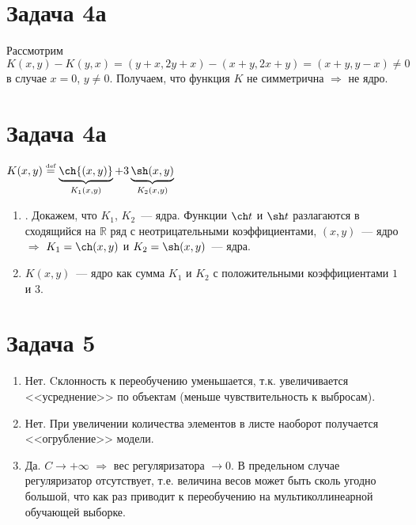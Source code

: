 \documentclass[a4paper]{article}
\def\eqdef{\overset{\mbox{\tiny def}}{=}}
\begin{document}
\section*{Задача 4а}
Рассмотрим $K(x,y)-K(y,x)=(y+x,2y+x)-(x+y,2x+y)=(x+y,y-x)\neq0$ в случае $x=0$, $y\neq 0$. Получаем, что функция $K$ не симметрична $\Rightarrow$ не ядро.
\section*{Задача 4а}
$K(x,y)\eqdef \underbrace{\ch{(x,y)}}_{K_1(x,y)}+3\underbrace{\sh(x,y)}_{K_2(x,y)}$
\begin{enumerate}
\item. Докажем, что $K_1$, $K_2$~--- ядра. Функции $\ch t$ и $\sh t$ разлагаются в сходящийся на $\mathbb{R}$ ряд с неотрицательными коэффициентами, $(x,y)$~--- ядро $\Rightarrow$ $K_1=\ch (x,y)$ и $K_2=\sh (x,y)$~--- ядра.
\item $K(x,y)$~--- ядро как сумма $K_1$ и $K_2$ с положительными коэффициентами $1$ и $3$.
\end{enumerate}
\section*{Задача 5}
\begin{enumerate}
\item Нет. Cклонность к переобучению уменьшается, т.к. увеличивается <<усреднение>> по объектам (меньше чувствительность к выбросам). %
\item Нет. При увеличении количества элементов в листе наоборот получается <<огрубление>> модели.
\item Да. $C\to+\infty$ $\Rightarrow$ вес регуляризатора $\to 0$. В предельном случае регуляризатор отсутствует, т.е. величина весов может быть сколь угодно большой, что как раз приводит к переобучению на мультиколлинеарной обучающей выборке.
\end{enumerate}	
\end{document}
